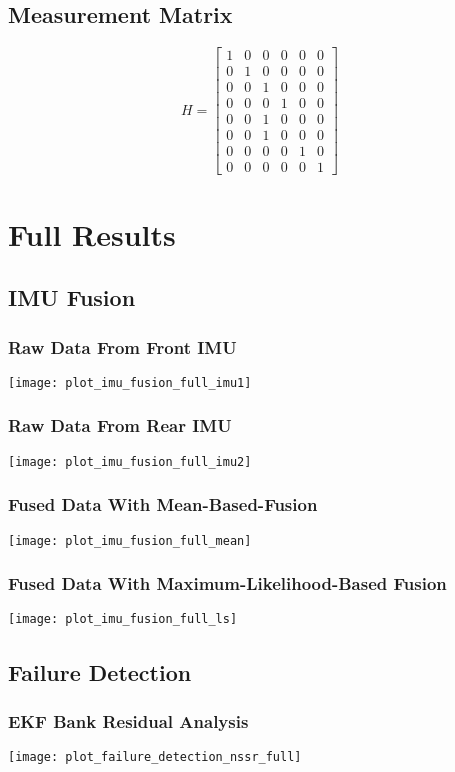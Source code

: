\section{Measurement Matrix}\label{sec:appendix-ekf-measurement}
\begin{equation*}%
H = \begin{bmatrix}%
1 & 0 & 0 & 0 & 0 & 0 \\%
0 & 1 & 0 & 0 & 0 & 0 \\%
0 & 0 & 1 & 0 & 0 & 0 \\%
0 & 0 & 0 & 1 & 0 & 0 \\%
0 & 0 & 1 & 0 & 0 & 0 \\%
0 & 0 & 1 & 0 & 0 & 0 \\%
0 & 0 & 0 & 0 & 1 & 0 \\%
0 & 0 & 0 & 0 & 0 & 1%
\end{bmatrix}%
\end{equation*}

\chapter{Full Results}

\section{IMU Fusion}\label{sec:appendix-imufusion}
\subsection{Raw Data From Front IMU}
\texttt{[image: plot\_imu\_fusion\_full\_imu1]}
\subsection{Raw Data From Rear IMU}
\texttt{[image: plot\_imu\_fusion\_full\_imu2]}
\subsection{Fused Data With Mean-Based-Fusion}
\texttt{[image: plot\_imu\_fusion\_full\_mean]}
\subsection{Fused Data With Maximum-Likelihood-Based Fusion}
\texttt{[image: plot\_imu\_fusion\_full\_ls]}

\section{Failure Detection}\label{sec:appendix-failure-detection}
\subsection{EKF Bank Residual Analysis}
\texttt{[image: plot\_failure\_detection\_nssr\_full]}
